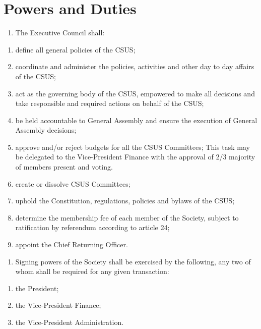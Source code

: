 \section{Powers and Duties}\label{powers-and-duties}

\begin{enumerate}
\def\labelenumi{\arabic{enumi}.}
\tightlist
\item
  The Executive Council shall:
\end{enumerate}

\begin{enumerate}
\def\labelenumi{(\alph{enumi})}
\tightlist
\item
  define all general policies of the CSUS;
\item
  coordinate and administer the policies, activities and other day to
  day affairs of the CSUS;
\item
  act as the governing body of the CSUS, empowered to make all decisions
  and take responsible and required actions on behalf of the CSUS;
\item
  be held accountable to General Assembly and ensure the execution of
  General Assembly decisions;
\item
  approve and/or reject budgets for all the CSUS Committees; This task
  may be delegated to the Vice-President Finance with the approval of
  2/3 majority of members present and voting.
\item
  create or dissolve CSUS Committees;
\item
  uphold the Constitution, regulations, policies and bylaws of the CSUS;
\item
  determine the membership fee of each member of the Society, subject to
  ratification by referendum according to article 24;
\item
  appoint the Chief Returning Officer.
\end{enumerate}

\begin{enumerate}
\def\labelenumi{\arabic{enumi}.}
\setcounter{enumi}{1}
\tightlist
\item
  Signing powers of the Society shall be exercised by the following, any
  two of whom shall be required for any given transaction:
\end{enumerate}

\begin{enumerate}
\def\labelenumi{(\alph{enumi})}
\tightlist
\item
  the President;
\item
  the Vice-President Finance;
\item
  the Vice-President Administration.
\end{enumerate}

